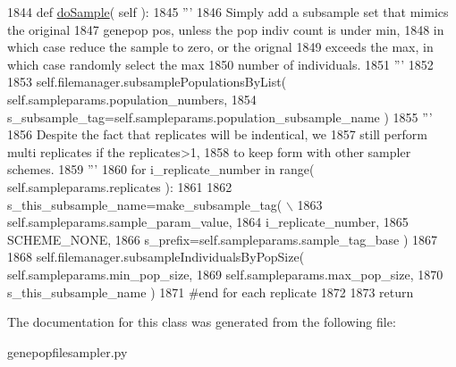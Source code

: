 \begin{DoxyCode}
1844     \textcolor{keyword}{def }\hyperlink{classnegui_1_1genepopfilesampler_1_1GenepopFileSamplerNone_a9e2c8b2d724ae8df46f21527486b485d}{doSample}( self ):
1845         \textcolor{stringliteral}{'''}
1846 \textcolor{stringliteral}{        Simply add a subsample set that mimics the original}
1847 \textcolor{stringliteral}{        genepop pos, unless the pop indiv count is under min,}
1848 \textcolor{stringliteral}{        in which case reduce the sample to zero, or the orignal}
1849 \textcolor{stringliteral}{        exceeds the max, in which case randomly select the max}
1850 \textcolor{stringliteral}{        number of individuals.}
1851 \textcolor{stringliteral}{        '''}
1852         
1853         self.filemanager.subsamplePopulationsByList( self.sampleparams.population\_numbers,
1854                                         s\_subsample\_tag=self.sampleparams.population\_subsample\_name )
1855         \textcolor{stringliteral}{'''}
1856 \textcolor{stringliteral}{        Despite the fact that replicates will be indentical, we}
1857 \textcolor{stringliteral}{        still perform multi replicates if the replicates>1,}
1858 \textcolor{stringliteral}{        to keep form with other sampler schemes.}
1859 \textcolor{stringliteral}{        '''}
1860         \textcolor{keywordflow}{for} i\_replicate\_number \textcolor{keywordflow}{in} range( self.sampleparams.replicates ): 
1861 
1862             s\_this\_subsample\_name=make\_subsample\_tag( \(\backslash\)
1863                         self.sampleparams.sample\_param\_value, 
1864                         i\_replicate\_number, 
1865                         SCHEME\_NONE,
1866                         s\_prefix=self.sampleparams.sample\_tag\_base )
1867 
1868             self.filemanager.subsampleIndividualsByPopSize( self.sampleparams.min\_pop\_size,
1869                                                             self.sampleparams.max\_pop\_size,
1870                                                             s\_this\_subsample\_name )
1871         \textcolor{comment}{#end for each replicate}
1872 
1873         \textcolor{keywordflow}{return}
\end{DoxyCode}


The documentation for this class was generated from the following file\+:\begin{DoxyCompactItemize}
\item 
genepopfilesampler.\+py\end{DoxyCompactItemize}
